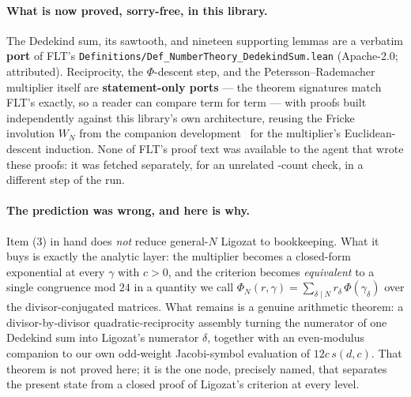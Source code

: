 \documentclass[11pt, a4paper]{article}
\newcommand{\brk}{\discretionary{}{}{}}
\newcommand{\lean}[1]{\ifmmode\text{\ttfamily\detokenize{#1}}\else{\ttfamily\detokenize{#1}}\fi}
\theoremstyle{remark}
\begin{document}
\paragraph{What is now proved, sorry-free, in this library.} The Dedekind sum, its sawtooth, and
nineteen supporting lemmas are a verbatim \textbf{port} of FLT's
\texttt{Definitions/\brk Def\_NumberTheory\_DedekindSum.lean} (Apache-2.0; attributed). Reciprocity, the
$\Phi$-descent step, and the Petersson--Rademacher multiplier itself are \textbf{statement-only
ports} --- the theorem signatures match FLT's exactly, so a reader can compare term for term --- with
proofs built independently against this library's own architecture, reusing the Fricke involution
$W_N$ from the companion development~\cite{Fricke2026} for the multiplier's Euclidean-descent
induction. None of FLT's proof text was available to the agent that wrote these proofs: it was
fetched separately, for an unrelated \lean{sorry}-count check, in a different step of the run.

\paragraph{The prediction was wrong, and here is why.} Item (3) in hand does \emph{not} reduce
general-$N$ Ligozat to bookkeeping. What it buys is exactly the analytic layer: the multiplier
becomes a closed-form exponential at every $\gamma$ with $c>0$, and the criterion becomes
\emph{equivalent} to a single congruence mod $24$ in a quantity we call $\Phi_N(r,\gamma) =
\sum_{\delta\mid N} r_\delta\,\Phi(\gamma_\delta)$ over the divisor-conjugated matrices. What
remains is a genuine arithmetic theorem: a divisor-by-divisor quadratic-reciprocity assembly
turning the numerator of one Dedekind sum into Ligozat's numerator $\delta$, together with an
even-modulus companion to our own odd-weight Jacobi-symbol evaluation of $12c\,s(d,c)$. That
theorem is not proved here; it is the one node, precisely named, that separates the present state
from a closed proof of Ligozat's criterion at every level.
\end{document}
